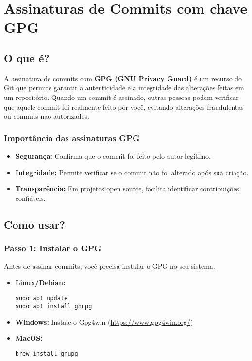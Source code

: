 \chapter{Assinaturas de Commits com chave GPG}

\section{O que é?}
A assinatura de commits com \textbf{GPG (GNU Privacy Guard)} é um recurso do Git que permite garantir a autenticidade e a integridade das alterações feitas em um repositório. Quando um commit é assinado, outras pessoas podem verificar que aquele commit foi realmente feito por você, evitando alterações fraudulentas ou commits não autorizados.

\subsection{Importância das assinaturas GPG}
\begin{itemize}
    \item \textbf{Segurança:} Confirma que o commit foi feito pelo autor legítimo.
    \item \textbf{Integridade:} Permite verificar se o commit não foi alterado após sua criação.
    \item \textbf{Transparência:} Em projetos open source, facilita identificar contribuições confiáveis.
\end{itemize}

\section{Como usar?}

\subsection{Passo 1: Instalar o GPG}
Antes de assinar commits, você precisa instalar o GPG no seu sistema.

\begin{itemize}
    \item \textbf{Linux/Debian:}
    \begin{verbatim}
sudo apt update
sudo apt install gnupg
    \end{verbatim}

    \item \textbf{Windows:} Instale o Gpg4win (\url{https://www.gpg4win.org/})

    \item \textbf{MacOS:} 
    \begin{verbatim}
brew install gnupg
    \end{verbatim}
\end{itemize}

